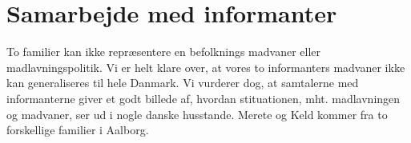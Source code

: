 \chapter{Samarbejde med informanter}
\label{akademiskinformanter}

To familier kan ikke repræsentere en befolknings madvaner eller madlavningspolitik. Vi er helt klare over, at vores to informanters madvaner ikke kan generaliseres til hele Danmark. Vi vurderer dog, at samtalerne med informanterne giver et godt billede af, hvordan stituationen, mht. madlavningen og madvaner, ser ud i nogle danske husstande. Merete og Keld kommer fra to forskellige familier i Aalborg.

